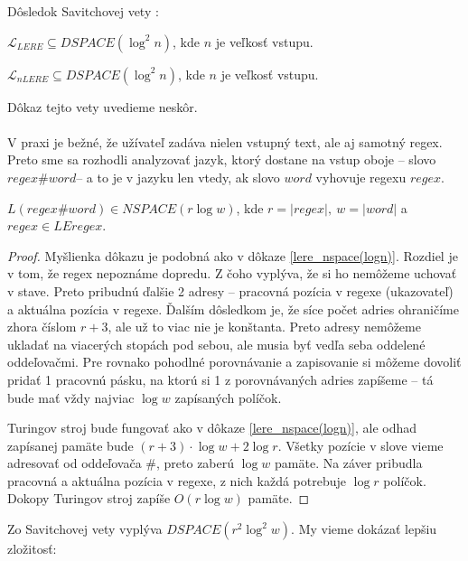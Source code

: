 \documentclass{svk_long_sk}
\def\le{LEregex}
\def\lel{\mathscr{L}_{LERE}}
\def\nlel{\mathscr{L}_{nLERE}}
\begin{document}
Dôsledok Savitchovej vety \cite{Savitch}:
\begin{theorem}\label{lel_dspace}
$\lel \subseteq DSPACE(\log^2 n)$, kde $n$ je veľkosť vstupu.
\end{theorem}
\begin{theorem}\label{nlel_dspace}
$\nlel \subseteq DSPACE(\log^2 n)$, kde $n$ je veľkosť vstupu.
\end{theorem}
Dôkaz tejto vety uvedieme neskôr.
\\ \\
V praxi je bežné, že užívateľ zadáva nielen vstupný text, ale aj samotný regex. Preto sme sa rozhodli analyzovať jazyk, ktorý dostane na vstup oboje -- slovo $regex\#word$-- a to je v jazyku len vtedy, ak slovo $word$ vyhovuje regexu $regex$.

\begin{theorem}
$L(regex\#word) \in NSPACE(r \log w)$, kde $r = |regex|,~w = |word|$ a $regex \in \le$.
\end{theorem}
\begin{proof}
Myšlienka dôkazu je podobná ako v dôkaze \ref{lere_nspace(logn)}. Rozdiel je v tom, že regex nepoznáme dopredu. Z čoho vyplýva, že si ho nemôžeme uchovať v stave. Preto pribudnú ďalšie 2 adresy -- pracovná pozícia v regexe (ukazovateľ) a aktuálna pozícia v regexe. Ďalším dôsledkom je, že síce počet adries ohraničíme zhora číslom $r+3$, ale už to viac nie je konštanta. Preto adresy nemôžeme ukladať na viacerých stopách pod sebou, ale musia byť vedľa seba oddelené oddeľovačmi. Pre rovnako pohodlné porovnávanie a zapisovanie si môžeme dovoliť pridať 1 pracovnú pásku, na ktorú si 1 z porovnávaných adries zapíšeme -- tá bude mať vždy najviac $\log w$ zapísaných políčok.

Turingov stroj bude fungovať ako v dôkaze \ref{lere_nspace(logn)}, ale odhad zapísanej pamäte bude $(r+3)\cdot \log w + 2\log r$. Všetky pozície v slove vieme adresovať od oddeľovača \#, preto zaberú $\log w$ pamäte. Na záver pribudla pracovná a aktuálna pozícia v regexe, z nich každá potrebuje $\log r$ políčok. Dokopy Turingov stroj zapíše $O(r\log w)$ pamäte.
\end{proof}

Zo Savitchovej vety vyplýva $DSPACE(r^2\log^2w)$. My vieme dokázať lepšiu zložitosť:
\end{document}
